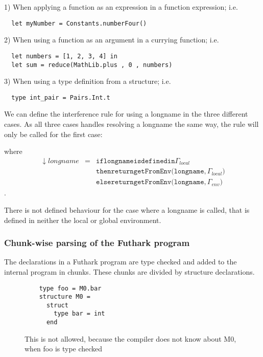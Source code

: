 1) When applying a function as an expression in a function expression; i.e.
\begin{verbatim}
  let myNumber = Constants.numberFour()
\end{verbatim}

2) When using a function as an argument in a currying function; i.e.
\begin{verbatim}
  let numbers = [1, 2, 3, 4] in
  let sum = reduce(MathLib.plus , 0 , numbers)
\end{verbatim}

3) When using a type definition from a structure; i.e.
\begin{verbatim}
  type int_pair = Pairs.Int.t 
\end{verbatim}



We can define the interference rule for using a longname in the three different
cases. As all three cases handles resolving a longname the same way, the rule
will only be called for the first case:

\begin{prooftree}
\end{prooftree}

where
\begin{align*}
  \downarrow longname & = & \mathtt{if longname is defined in }\Gamma_{local} \\
                      &   & \mathtt{  then return getFromEnv(longname, }\Gamma_{local}) \\
                      &   & \mathtt{else return getFromEnv(longname, }\Gamma_{env})
\end{align*}.

There is not defined behaviour for the case where a longname is called, that is
defined in neither the local or global environment.
\subsubsection{Chunk-wise parsing of the Futhark program}
The declarations in a Futhark program are type checked and added to the internal program in
chunks.
These chunks are divided by structure declarations.

\begin{figure}
  \begin{verbatim}
    type foo = M0.bar
    structure M0 =
      struct
        type bar = int
      end
  \end{verbatim}
  \caption{This is not allowed, because the compiler does not know about M0,
    when foo is type checked}
\end{figure}

